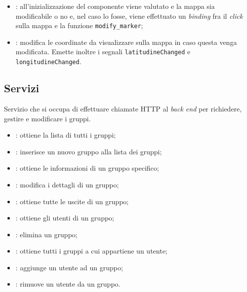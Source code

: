 \begin{itemize}
    \item {}: all'inizializzazione del componente viene valutato e la mappa sia modificabile o no e, nel caso lo fosse, viene effettuato un \textit{binding} fra il \textit{click} sulla mappa e la funzione \texttt{modify\_marker};
    \item {}: modifica le coordinate da visualizzare sulla mappa in caso questa venga modificata. Emette inoltre i segnali \texttt{latitudineChanged} e \texttt{longitudineChanged}.
\end{itemize}


\subsection{Servizi}
\label{par:GruppiService}
Servizio che si occupa di effettuare chiamate HTTP al \textit{back end} per richiedere, gestire e modificare i gruppi.

\begin{itemize}
    \item {}: ottiene la lista di tutti i gruppi;
    \item {}: inserisce un nuovo gruppo alla lista dei gruppi;
    \item {}: ottiene le informazioni di un gruppo specifico;
    \item {}: modifica i dettagli di un gruppo;
    \item {}: ottiene tutte le uscite di un gruppo; 
    \item {}: ottiene gli utenti di un gruppo;
    \item {}: elimina un gruppo;
    \item {}: ottiene tutti i gruppi a cui appartiene un utente; 
    \item {}: aggiunge un utente ad un gruppo;  
    \item {}: rimuove un utente da un gruppo.
\end{itemize}
